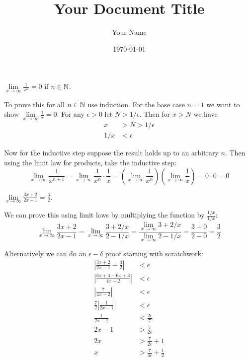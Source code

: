 \documentclass{article}
\title{Your Document Title}
\author{Your Name}
\date{\today} %
\begin{document}
\maketitle
\begin{problem}
$\lim\limits_{x\to \infty} \frac{1}{x^n} = 0$ if $n \in \mathbb{N}$.
\end{problem}

To prove this for all $n\in\mathbb{N}$ use induction. For the base case $n=1$ we want to show $\lim\limits_{x\to\infty} \frac{1}{x} = 0$. For any $\epsilon > 0$ let $N > 1/\epsilon$. Then for $x > N$ we have
\begin{align*}
  x   & > N > 1/\epsilon \\
  1/x & < \epsilon
\end{align*}

Now for the inductive step suppose the result holds up to an arbitrary $n$. Then using the limit law for products, take the inductive step:
$$\lim_{x\to\infty} \frac{1}{x^{n+1}} = \lim_{x\to\infty} \frac{1}{x^n} \cdot \frac{1}{x} = \left(\lim_{x\to\infty} \frac{1}{x^n}\right)\left(\lim_{x \to \infty} \frac{1}{x}\right) = 0 \cdot 0 = 0$$

\begin{problem}
$\lim\limits_{x\to\infty} \frac{3x + 2}{2x - 1} = \frac{3}{2}$.
\end{problem}

We can prove this using limit laws by multiplying the function by $\frac{1/x}{1/x}$:
$$\lim_{x\to\infty} \frac{3x + 2}{2x - 1} = \lim_{x\to\infty} \frac{3 + 2/x}{2 - 1/x} = \frac{\lim_{x\to\infty} 3 + 2/x}{\lim_{x\to\infty} 2 - 1/x} = \frac{3 + 0}{2 - 0} = \frac{3}{2}$$

Alternatively we can do an $\epsilon-\delta$ proof starting with scratchwork:
\begin{align*}
  \left|\frac{3x + 2}{2x - 1} - \frac{3}{2}\right| & < \epsilon                          \\
  \left|\frac{6x + 4 - 6x + 3}{4x - 2}\right|      & < \epsilon                          \\
  \left|\frac{7}{4x - 2}\right|                    & < \epsilon                          \\
  \frac{7}{2}\left|\frac{1}{2x - 1}\right|         & < \epsilon                          \\
  \frac{1}{2x - 1}                                 & < \frac{2\epsilon}{7}               \\
  2x - 1                                           & > \frac{7}{2\epsilon}               \\
  2x                                               & > \frac{7}{2\epsilon}+1             \\
  x                                                & > \frac{7}{4\epsilon} + \frac{1}{2}
\end{align*}
\end{document}
